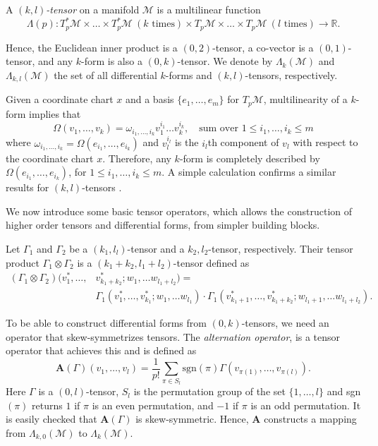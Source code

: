\begin{definition}
A \emph{$(k,l)$-tensor} on a manifold $\mathcal M$ is a multilinear function 
\[
	\Lambda(p):T_p^*\mathcal M \times \dots \times T_p^*\mathcal M \ (k \text{ times}) \times T_p\mathcal M \times \dots \times T_p\mathcal M \ (l \text{ times}) \to \mathbb R.
\]
\end{definition}
Hence, the Euclidean inner product is a $(0,2)$-tensor, a co-vector is a $(0,1)$-tensor, and any $k$-form is also a $(0,k)$-tensor. We denote by $\Lambda_{k}(\mathcal M)$ and $\Lambda_{k,l}(\mathcal M)$ the set of all differential $k$-forms and $(k,l)$-tensors, respectively.

Given a coordinate chart $x$ and a basis $\{ e_1,\dots,e_m\}$ for $T_{p}\mathcal M$, multilinearity of a $k$-form implies that
\begin{equation} \label{eq:2.6}
	\Omega(v_1,\dots,v_k) = \omega_{i_1,\dots,i_k} v_{1}^{i_1}\dots v_{k}^{i_k}, \quad \text{sum over }1 \leq i_1,\dots,i_k \leq m
\end{equation}
where $\omega_{i_1,\dots,i_k} = \Omega(e_{i_1},\dots,e_{i_k})$ and $v_{l}^{i_l}$ is the $i_l$th component of $v_l$ with respect to the coordinate chart $x$. Therefore, any $k$-form is completely described by $\Omega(e_{i_1},\dots,e_{i_k})$, for $1 \leq i_1,\dots,i_k \leq m$. A simple calculation confirms a similar results for $(k,l)$-tensors \cite{Wald:106274}.

We now introduce some basic tensor operators, which allows the construction of higher order tensors and differential forms, from simpler building blocks.
\begin{definition}
	Let $\Gamma_1$ and $\Gamma_2$ be a $(k_1,l_l)$-tensor and a $k_2,l_2$-tensor, respectively. Their tensor product $\Gamma_1\otimes \Gamma_2$ is a $(k_1+k_2,l_1+l_2)$-tensor defined as
\[
	\begin{aligned}
	(\Gamma_1\otimes \Gamma_2)(v^*_1,\dots,&v^*_{k_1+k_2};w_1,\dots w_{l_1+l_2}) = \\
		&\Gamma_1(v^*_1,\dots,v^*_{k_1};w_1,\dots w_{l_1})\cdot \Gamma_1(v^*_{k_1+1},\dots,v^*_{k_1+k_2};w_{l_1+1},\dots w_{l_1+l_2}).
	\end{aligned}
\]
\end{definition}
To be able to construct differential forms from $(0,k)$-tensors, we need an operator that skew-symmetrizes tensors. The \emph{alternation operator}, is a tensor operator that achieves this and is defined as
\begin{equation} \label{eq:2.7}
	\textbf{A}(\Gamma)(v_1,\dots,v_l) = \frac{1}{p!} \sum_{\pi \in S_l} \text{sgn}(\pi) \Gamma(v_{\pi(1)},\dots,v_{\pi(l)}).
\end{equation}
Here $\Gamma$ is a $(0,l)$-tensor, $S_l$ is the permutation group of the set $\{1,\dots,l\}$ and sgn$(\pi)$ returns $1$ if $\pi$ is an even permutation, and $-1$ if $\pi$ is an odd permutation. It is easily checked that $\textbf{A}(\Gamma)$ is skew-symmetric. Hence, $\textbf{A}$ constructs a mapping from $\Lambda_{k,0}(\mathcal M)$ to $\Lambda_{k}(\mathcal M)$.

